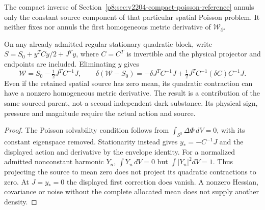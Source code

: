 \documentclass[12pt,a4paper]{article}
\begin{document}
\begin{proposition}
\label{p8:prop:v2205-nonlinear-mean-not-poisson-zero}
The compact inverse of Section~\ref{p8:sec:v2204-compact-poisson-reference}
annuls only the constant source component of that particular spatial
Poisson problem. It neither fixes nor annuls the first homogeneous
metric derivative of $\mathcal W_\partial$.

On any already admitted regular stationary quadratic block, write
$S=S_0+y^TCy/2+J^Ty$, where $C=C^T$ is invertible and the physical
projector and endpoints are included. Eliminating $y$ gives
\[
 \mathcal W=S_0-\tfrac12J^TC^{-1}J,
 \qquad
 \delta(\mathcal W-S_0)
 =-\delta J^TC^{-1}J
  +\tfrac12J^TC^{-1}(\delta C)C^{-1}J.
\]
Even if the retained spatial source has zero mean, its quadratic
contraction can have a nonzero homogeneous metric derivative. The result
is a contribution of the same sourced parent, not a second independent
dark substance. Its physical sign, pressure and magnitude require the
actual action and source.
\end{proposition}
\begin{proof}
The Poisson solvability condition follows from
$\int_{S^3}\Delta\Phi\,dV=0$, with its constant eigenspace removed.
Stationarity instead gives $y_*=-C^{-1}J$ and the displayed action and
derivative by the envelope identity. For a normalized admitted nonconstant
harmonic $Y_n$, $\int Y_n\,dV=0$ but $\int|Y_n|^2dV=1$.
Thus projecting the source to mean zero does not project its quadratic
contractions to zero. At $J=y_*=0$ the displayed first correction does
vanish. A nonzero Hessian, covariance or noise without the complete
allocated mean does not supply another density.
\end{proof}

\end{document}
